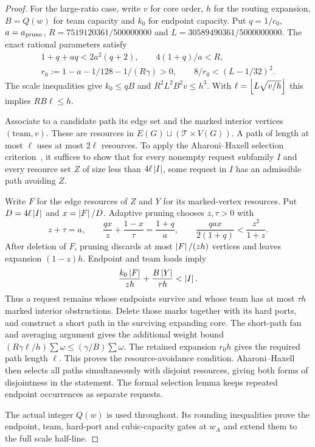 \begin{proof}
For the large-ratio case, write $v$ for core order, $h$ for the routing
expansion, $B=Q(w)$ for team capacity and $k_0$ for endpoint capacity.
Put $q=1/c_0$, $a=a_{\rm prune}$, $R=7519120361/500000000$ and
$L=30589490361/5000000000$. The exact rational parameters satisfy
\begin{gather*}
 1+q+aq<2a^2(q+2),\qquad 4(1+q)/a<R,\\
 r_0:=1-a-1/128-1/(R\gamma)>0,\qquad
 8/r_0<(L-1/32)^2.
\end{gather*}
The scale inequalities give $k_0\le qB$ and
$R^2L^2B^2v\le h^3$. With $\ell=\left\lfloor L\sqrt{v/h}\right\rfloor$ this implies
$RB\ell\le h$.

Associate to a candidate path its edge set and the marked interior vertices
$(\text{team},v)$. These are resources in
$E(G)\sqcup(\mathcal T\times V(G))$. A path of length at most $\ell$
uses at most $2\ell$ resources. To apply the Aharoni--Haxell selection
criterion~\cite{AH2000}, it suffices to show that for every nonempty
request subfamily $I$ and every resource set $Z$ of size less than
$4\ell\left|I\right|$, some request in $I$ has an admissible path avoiding $Z$.

Write $F$ for the edge resources of $Z$ and $Y$ for its marked-vertex
resources. Put $D=4\ell\left|I\right|$ and $x=\left|F\right|/D$. Adaptive pruning chooses
$z,\tau>0$ with
\[
 z+\tau=a,\qquad \frac{qx}{z}+\frac{1-x}{\tau}=\frac{1+q}{a},
 \qquad \frac{qax}{2(1+q)}<\frac{z^2}{1+z}.
\]
After deletion of $F$, pruning discards at most $\left|F\right|/(zh)$ vertices
and leaves expansion $(1-z)h$. Endpoint and team loads imply
\[
          \frac{k_0\left|F\right|}{zh}+\frac{B\left|Y\right|}{\tau h}<\left|I\right|.
\]
Thus a request remains whose endpoints survive and whose team has at most
$\tau h$ marked interior obstructions. Delete those marks together with
its hard ports, and construct a short path in the surviving expanding core.
The short-path fan and averaging argument gives the additional weight bound
$(R\gamma\ell/h)\sum\omega\le(\gamma/B)\sum\omega$.
The retained expansion $r_0h$ gives the required path length $\ell$.
This proves the resource-avoidance condition. Aharoni--Haxell then selects
all paths simultaneously with disjoint resources, giving both forms of
disjointness in the statement. The formal selection lemma keeps repeated
endpoint occurrences as separate requests.

The actual integer $Q(w)$ is used throughout. Its rounding inequalities
prove the endpoint, team, hard-port and cubic-capacity gates at $w_A$ and
extend them to the full scale half-line.


\end{proof}

